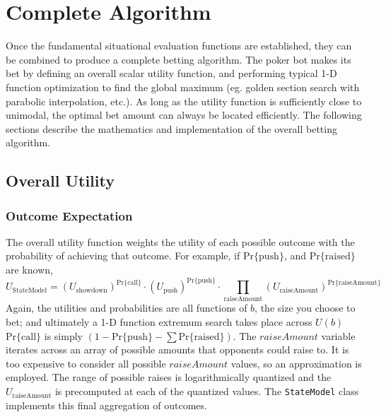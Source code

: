 
\clearpage




\chapter{Complete Algorithm}
\label{sec:CompleteAlgorithm}

Once the fundamental situational evaluation functions are established, they can be combined to produce a complete betting algorithm.
The poker bot makes its bet by defining an overall scalar utility function, and performing typical 1-D function optimization to find the global maximum (eg. golden section search with parabolic interpolation, etc.).
As long as the utility function is sufficiently close to unimodal, the optimal bet amount can always be located efficiently.
The following sections describe the mathematics and implementation of the overall betting algorithm.

\section{Overall Utility}
\label{sec:OverallUtility}


\subsection{Outcome Expectation}

The overall utility function weights the utility of each possible outcome with the probability of achieving that outcome.
For example, if $\mathrm{Pr\{push}\}$, and $\mathrm{Pr\{raised}\}$ are known, %
\[
U_\mathrm{StateModel} = \left(U_\mathrm{showdown}\right)^{\mathrm{Pr\{call\}}} \cdot \left(U_\mathrm{push}\right)^{\mathrm{Pr\{push}\}} \cdot \prod_\mathrm{raiseAmount} \left(U_\mathrm{raiseAmount}\right)^{\mathrm{Pr\{raiseAmount}\}}
\]
Again, the utilities and probabilities are all functions of $b$, the size you choose to bet; and ultimately a 1-D function extremum search takes place across $U\left(b\right)$
$\mathrm{Pr\{call\}}$ is simply $\left(1 - \mathrm{Pr\{push}\} - \sum \mathrm{Pr\{raised}\}\right)$.
The $raiseAmount$ variable iterates across an array of possible amounts that opponents could raise to.
It is too expensive to consider all possible $raiseAmount$ values, so an approximation is employed.
The range of possible raises is logarithmically quantized and the $U_\mathrm{raiseAmount}$ is precomputed at each of the quantized values.
The \texttt{StateModel} class implements this final aggregation of outcomes.

